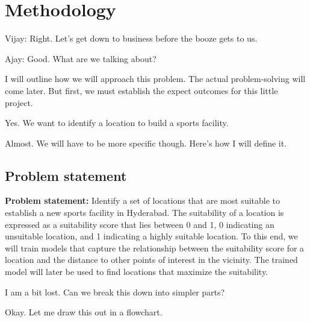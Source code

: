 \chapter{Methodology}\label{chap:methodology}


Vijay: Right. Let's get down to business before the booze gets to us. 

{\color{blue} Ajay: Good. What are we talking about?}

I will outline how we will approach this problem. The actual problem-solving will come later. But first, we must establish the expect outcomes for this little project. 

{\color{blue} Yes. We want to identify a location to build a sports facility.}

Almost. We will have to be more specific though. Here's how I will define it. 

\section{Problem statement}

\textbf{Problem statement:} Identify a set of locations that are most suitable to establish a new sports facility in Hyderabad. The suitability of a location is expressed as a suitability score that lies between 0 and 1, 0 indicating an unsuitable location, and 1 indicating a highly suitable location. To this end, we will train models that capture the relationship between the suitability score for a location and the distance to other points of interest in the vicinity. The trained model will later be used to find locations that maximize the suitability.

{\color{blue} I am a bit lost. Can we break this down into simpler parts? }

Okay. Let me draw this out in a flowchart. 

